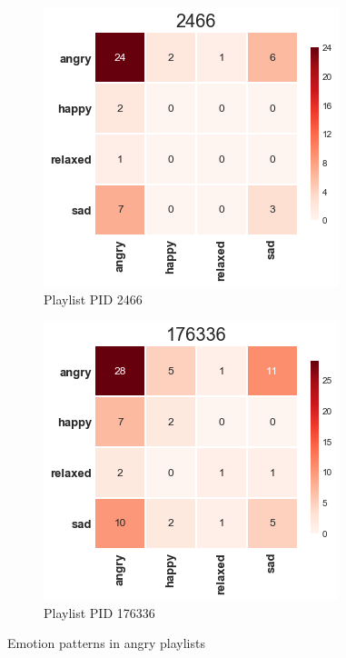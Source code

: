 \begin{figure}[H]
  \centering
  \begin{subfigure}[b]{0.49\linewidth}
    \includegraphics[width=\linewidth]{./chapters/chapter5/images/2466.png}
    \caption{Playlist PID 2466}
  \end{subfigure}
  \begin{subfigure}[b]{0.49\linewidth}
   \includegraphics[width=\linewidth]{./chapters/chapter5/images/176336.png}
    \caption{Playlist PID 176336}
  \end{subfigure}
  \caption{Emotion patterns in angry playlists}
  \label{fig:pattern1}
\end{figure}

